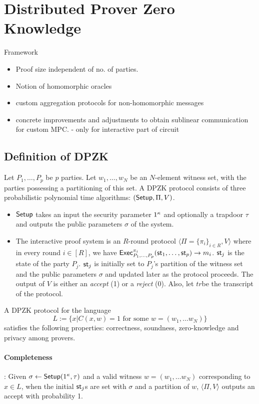 \section{Distributed Prover Zero Knowledge}
Framework
\begin{itemize}
\item Proof size independent of no. of parties.
\item Notion of homomorphic oracles
\item custom aggregation protocols for non-homomorphic messages
\item concrete improvements and adjustments to obtain sublinear communication for custom MPC. - only for interactive part of circuit
\end{itemize}

\subsection{Definition of DPZK}
Let $P_1, \ldots, P_p$ be $p$ parties. Let $w_1, \ldots, w_N$ be an $N$-element witness set, with the parties possessing a partitioning of this set. A DPZK protocol consists of three probabilistic polynomial time algorithms: $(\mathsf{Setup}, \Pi, V)$. 
\begin{itemize}
\item $\mathsf{Setup}$ takes an input the security parameter $1^{\kappa}$ and optionally a trapdoor $\tau$ and outputs the public parameters $\sigma$ of the system.
\item The interactive proof system is an $R$-round protocol $\langle \Pi = \{\pi_i\}_{i \in R}, V \rangle$ where in every round $i \in [R]$, we have $\mathsf{Exec}^{\pi_i}_{P_1, \ldots, P_p}(\mathsf{st}_1, \ldots, \mathsf{st}_p) \rightarrow m_i$. $\mathsf{st}_j$ is the state of the party $P_j$. $\mathsf{st}_j$ is initially set to $P_j$'s partition of the witness set and the public parameters $\sigma$ and updated later as the protocol proceeds. The output of $V$ is either an \textit{accept} (1) or a \textit{reject} (0). Also, let $tr$be the transcript of the protocol.
\end{itemize}
A DPZK protocol for the language 
\[
L := \{ x | C(x, w) =1 \text{ for some } w = (w_1, \ldots w_N) \}
\]
satisfies the following properties: 
correctness, soundness, zero-knowledge and privacy among provers.
\paragraph{Completeness}: %
Given $\sigma \gets \mathsf{Setup}(1^{\kappa}, \tau)$ and a valid witness $w = (w_1, \ldots w_N)$ corresponding to $x \in L$, when the initial $\mathsf{st}_j$s are set with $\sigma$ and a partition of $w$, $\langle \Pi, V \rangle$ outputs an accept with probability 1.

